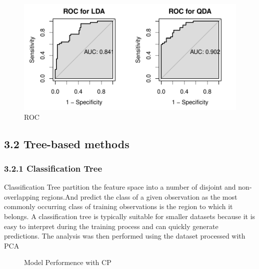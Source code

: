 \documentclass[
  12pt,
  letterpaper,
  DIV=11,
  numbers=noendperiod]{scrartcl}
\begin{document}
\begin{figure}[H]

{\centering \includegraphics{me_files/figure-pdf/ROC of LDA and QDA-1.pdf}

}

\caption{ROC}

\end{figure}%

\subsection{3.2 Tree-based methods}\label{tree-based-methods}

\subsubsection{3.2.1 Classification Tree}\label{classification-tree}

Classification Tree partition the feature space into a number of
disjoint and non-overlapping regions.And predict the class of a given
observation as the most commonly occurring class of training
observations is the region to which it belongs. A classification tree is
typically suitable for smaller datasets because it is easy to interpret
during the training process and can quickly generate predictions. The
analysis was then performed using the dataset processed with PCA

\begin{figure}


\caption{\label{fig-tree1}Model Performence with CP}

\end{figure}%
\end{document}
